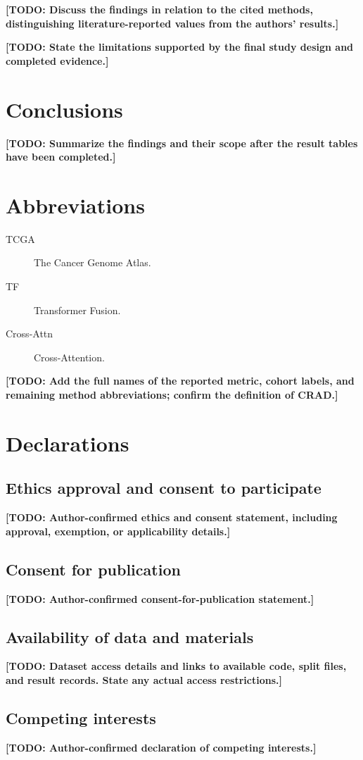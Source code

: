 \documentclass[pdflatex,sn-vancouver-num]{sn-jnl}
\newcommand{\TODO}[1]{\textbf{[TODO: #1]}}
\begin{document}
\TODO{Discuss the findings in relation to the cited methods,
distinguishing literature-reported values from the authors' results.}

\TODO{State the limitations supported by the final study design
and completed evidence.}

\section{Conclusions}
\TODO{Summarize the findings and their scope after the result tables
have been completed.}

\section*{Abbreviations}
\begin{description}
  \item[TCGA] The Cancer Genome Atlas.
  \item[TF] Transformer Fusion.
  \item[Cross-Attn] Cross-Attention.
\end{description}
\TODO{Add the full names of the reported metric, cohort labels,
and remaining method abbreviations; confirm the definition of CRAD.}

\section*{Declarations}
\subsection*{Ethics approval and consent to participate}
\TODO{Author-confirmed ethics and consent statement, including
approval, exemption, or applicability details.}

\subsection*{Consent for publication}
\TODO{Author-confirmed consent-for-publication statement.}

\subsection*{Availability of data and materials}
\TODO{Dataset access details and links to available code, split
files, and result records. State any actual access restrictions.}

\subsection*{Competing interests}
\TODO{Author-confirmed declaration of competing interests.}
\end{document}
